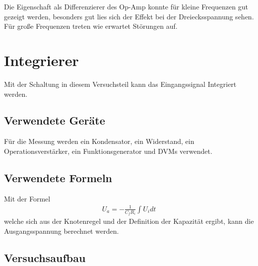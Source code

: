 \documentclass[12pt,a4paper]{article}
\begin{document}
Die Eigenschaft als Differenzierer des Op-Amp konnte für kleine Frequenzen gut gezeigt werden, besonders gut lies sich der Effekt bei der Dreiecksspannung sehen. Für große Frequenzen treten wie erwartet Störungen auf.

\section{Integrierer}
Mit der Schaltung in diesem Versuchsteil kann das Eingangssignal Integriert werden.
\subsection{Verwendete Geräte}

Für die Messung werden ein Kondensator, ein Widerstand, ein Operationsverstärker, ein Funktionsgenerator und DVMs verwendet.

\subsection{Verwendete Formeln}
Mit der Formel
\begin{align}
U_a = -\frac{1}{C_fR_i}\int U_idt
\end{align}
welche sich aus der Knotenregel und der Definition der Kapazität ergibt, kann die Ausgangsspannung berechnet werden.
\subsection{Versuchsaufbau}
\end{document}
